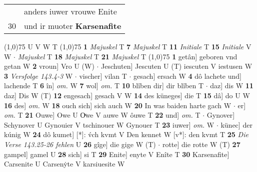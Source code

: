 \documentclass[8pt,a4paper,notitlepage]{article}
\begin{document}
\begin{table}[ht]
\begin{minipage}[t]{0.5\linewidth}
\begin{tabular}{rl}
 & anders iuwer vrouwe Enite\\ 
30 & und ir muoter \textbf{Karsenafite}\\ 
\end{tabular}
\scriptsize
\line(1,0){75} \newline
U V W T \newline
\line(1,0){75} \newline
\textbf{1} \textit{Majuskel} T  \textbf{7} \textit{Majuskel} T  \textbf{11} \textit{Initiale} T  \textbf{15} \textit{Initiale} V W   $\cdot$ \textit{Majuskel} T  \textbf{18} \textit{Majuskel} T  \textbf{21} \textit{Majuskel} T  \newline
\line(1,0){75} \newline
\textbf{1} getân] geboren vnd getan W \textbf{2} vroun] Vro U (W)  $\cdot$ Jeschuten] Jescuten U (T) iescuten V iestusen W \textbf{3} \textit{Versfolge 143.4-3} W   $\cdot$ vischer] vilan T  $\cdot$ gesach] ersach W \textbf{4} dô lachete und] lachende T \textbf{6} în] \textit{om.} W \textbf{7} wol] \textit{om.} T \textbf{10} blîben dir] dir blîben T  $\cdot$ daz] dis W \textbf{11} daz] Dis W (T) \textbf{12} engesach] gesach V W \textbf{14} des küneges] die T \textbf{15} dâ] do U W \textbf{16} des] \textit{om.} W \textbf{18} ouch sich] sich auch W \textbf{20} In was baiden harte gach W  $\cdot$ er] \textit{om.} T \textbf{21} Ouwe] Owe U Oͮwe V auwe W ôuwe T \textbf{22} und] \textit{om.} T  $\cdot$ Gynover] Schynover U Gynouier V tschinouer W Gynouer T \textbf{23} iuwer] \textit{om.} W  $\cdot$ künec] der kúnig W \textbf{24} dô kumet] [*]: v́ch kvmt V Den kennet W [v*]: den kvmt T \textbf{25} \textit{Die Verse 143.25-26 fehlen} U  \textbf{26} gîge] die gige W (T)  $\cdot$ rotte] die rotte W (T) \textbf{27} gampel] gamel U \textbf{28} sich] si T \textbf{29} Enite] enyte V Enîte T \textbf{30} Karsenafite] Carsenite U Carsenẏte V karsiuesite W \newline
\end{minipage}
\end{table}
\end{document}

